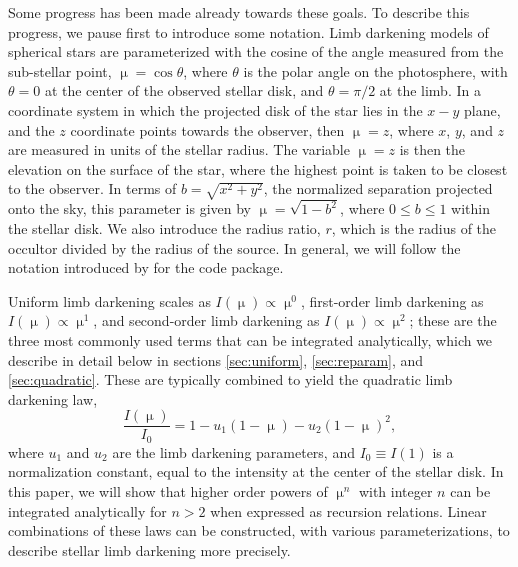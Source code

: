 \documentclass[modern,trackchanges]{aastex63}
\begin{document}
Some progress has been made already towards these goals.  To describe this
progress, we pause first to introduce some notation.  Limb darkening models
of spherical stars are parameterized with the cosine of the angle measured
from the sub-stellar point, $\upmu = \cos{\theta}$, where $\theta$ is the
polar angle on the photosphere, with $\theta=0$ at the center of the observed
stellar disk, and $\theta=\pi/2$ at the limb.  In a coordinate system in which
the projected disk of the star lies in the $x-y$ plane, and the $z$ coordinate
points towards the observer, then $\upmu = z$, where $x$, $y$, and $z$ are 
measured in units of the stellar radius.  The variable $\upmu=z$ is then the 
elevation on the surface of the star, where the highest point is taken to be 
closest to the observer.  In terms of $b=\sqrt{x^2+y^2}$, the normalized separation projected onto
the sky, this parameter is given by $\upmu =\sqrt{1-b^2}$, where
$0\le b \le 1$ within the stellar disk.  We also introduce the radius ratio,
$r$, which is the radius of the occultor divided by the radius of the source.
In general, we will follow the notation
introduced by \citet{starry} for the \starry code package.

Uniform limb darkening scales as $I(\upmu) \propto \upmu^0$, first-order
limb darkening as $I(\upmu) \propto \upmu^1$, and second-order limb darkening
as $I(\upmu)\propto \upmu^2$; these are the three most commonly used  terms
that can be integrated analytically, which we describe in detail below
in sections \ref{sec:uniform}, \ref{sec:reparam}, and \ref{sec:quadratic}.
These are typically combined to yield the quadratic limb darkening law,
%
\begin{equation} \label{eq:quadraticld}
    \frac{I(\upmu)}{I_0} = 1-u_1 (1-\upmu) - u_2 (1-\upmu)^2,
\end{equation}
%
where $u_1$ and $u_2$ are the limb darkening parameters, and
$I_0 \equiv I(1)$ is a normalization constant, equal to the
intensity at the center of the stellar disk.
In this paper, we will show that higher order powers of $\upmu^n$ with integer
$n$ can be integrated analytically for $n > 2$ when expressed as recursion relations.
Linear combinations of these laws can be constructed,
with various parameterizations, to describe stellar limb darkening more precisely.
\end{document}
